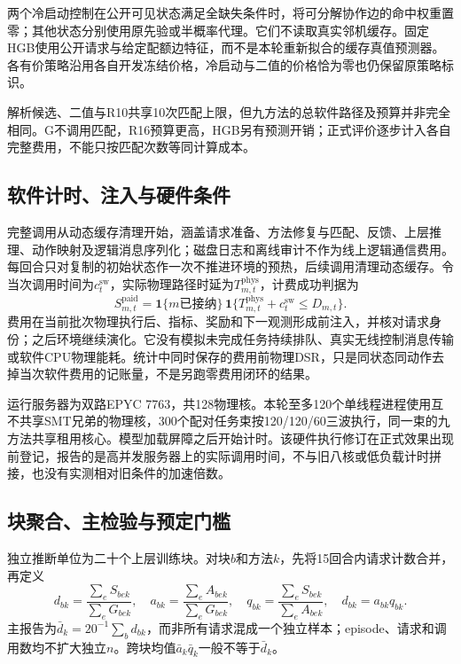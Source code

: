 两个冷启动控制在公开可见状态满足全缺失条件时，将可分解协作边的命中权重置零；其他状态分别使用原先验或半概率代理。它们不读取真实邻机缓存。固定HGB使用公开请求与给定配额边特征，而不是本轮重新拟合的缓存真值预测器。各有价策略沿用各自开发冻结价格，冷启动与二值的价格恰为零也仍保留原策略标识。

解析候选、二值与R10共享10次匹配上限，但九方法的总软件路径及预算并非完全相同。G不调用匹配，R16预算更高，HGB另有预测开销；正式评价逐步计入各自完整费用，不能只按匹配次数等同计算成本。

\subsection{软件计时、注入与硬件条件}
完整调用从动态缓存清理开始，涵盖请求准备、方法修复与匹配、反馈、上层推理、动作映射及逻辑消息序列化；磁盘日志和离线审计不作为线上逻辑通信费用。每回合只对复制的初始状态作一次不推进环境的预热，后续调用清理动态缓存。令当次调用时间为$c_t^{\mathrm{sw}}$，实际物理路径时延为$T^{\mathrm{phys}}_{m,t}$，计费成功判据为
\begin{equation}
 S_{m,t}^{\mathrm{paid}}=\mathbf1\{m\text{已接纳}\}\,
 \mathbf1\{T^{\mathrm{phys}}_{m,t}+c_t^{\mathrm{sw}}\le D_{m,t}\}.
 \label{eq:cost-paid-success}
\end{equation}
费用在当前批次物理执行后、指标、奖励和下一观测形成前注入，并核对请求身份；之后环境继续演化。它没有模拟未完成任务持续排队、真实无线控制消息传输或软件CPU物理能耗。统计中同时保存的费用前物理DSR，只是同状态同动作去掉当次软件费用的记账量，不是另跑零费用闭环的结果。

运行服务器为双路EPYC 7763，共128物理核。本轮至多120个单线程进程使用互不共享SMT兄弟的物理核，300个配对任务束按120/120/60三波执行，同一束的九方法共享租用核心。模型加载屏障之后开始计时。该硬件执行修订在正式效果出现前登记，报告的是高并发服务器上的实际调用时间，不与旧八核或低负载计时拼接，也没有实测相对旧条件的加速倍数。

\subsection{块聚合、主检验与预定门槛}
独立推断单位为二十个上层训练块。对块$b$和方法$k$，先将15回合内请求计数合并，再定义
\begin{equation}
 d_{bk}=\frac{\sum_e S_{bek}}{\sum_e G_{bek}},\quad
 a_{bk}=\frac{\sum_e A_{bek}}{\sum_e G_{bek}},\quad
 q_{bk}=\frac{\sum_e S_{bek}}{\sum_e A_{bek}},\quad d_{bk}=a_{bk}q_{bk}.
 \label{eq:cost-block-rates}
\end{equation}
主报告为$\bar d_k=20^{-1}\sum_b d_{bk}$，而非所有请求混成一个独立样本；episode、请求和调用数均不扩大独立$n$。跨块均值$\bar a_k\bar q_k$一般不等于$\bar d_k$。

